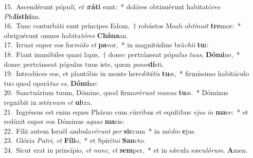 {15.~}Ascendérunt pópu\textit{li}, \textit{et} \textit{i}\textbf{rá}\textbf{ti} sunt:~* dolóres obtinuérunt habitató\textit{res} \textit{Phi}\textbf{lís}\textbf{thi}im.\\
{16.~}Tunc conturbáti sunt príncipes Edom,~† robústos Moab ob\textit{tí}\textit{nu}\textit{it} \textbf{tre}mor:~* obriguérunt omnes habita\textit{tó}\textit{res} \textbf{Chá}\textbf{na}an.\\
{17.~}Irruat super eos for\textit{mí}\textit{do} \textit{et} \textbf{pa}vor,~* in magnitúdine brá\textit{chi}\textit{i} \textbf{tu}i:\\
{18.~}Fiant immóbiles quasi lapis,~† donec pertránseat pópu\textit{lus} \textit{tu}\textit{us}, \textbf{Dó}\textbf{mi}ne,~* donec pertránseat pópulus tuus iste, quem \textit{pos}\textit{se}\textbf{dí}sti.\\
{19.~}Introdúces eos, et plantábis in monte here\textit{di}\textit{tá}\textit{tis} \textbf{tu}æ,~* firmíssimo habitáculo tuo quod operá\textit{tus} \textit{es}, \textbf{Dó}\textbf{mi}ne:\\
{20.~}Sanctuárium tuum, Dómine, quod firmavé\textit{runt} \textit{ma}\textit{nus} \textbf{tu}æ.~* Dóminus regnábit in ætér\textit{num} \textit{et} \textbf{ul}tra.\\
{21.~}Ingréssus est enim eques Phárao cum cúrribus et equítibus \textit{e}\textit{jus} \textit{in} \textbf{ma}re:~* et redúxit super eos Dóminus \textit{a}\textit{quas} \textbf{ma}ris:\\
{22.~}Fílii autem Israël ambula\textit{vé}\textit{runt} \textit{per} \textbf{sic}cum~* in mé\textit{di}\textit{o} \textbf{e}jus.\\
{23.~}Glória \textit{Pa}\textit{tri}, \textit{et} \textbf{Fí}\textbf{li}o,~* et Spirí\textit{tu}\textit{i} \textbf{San}cto.\\
{24.~}Sicut erat in princípio, \textit{et} \textit{nunc}, \textit{et} \textbf{sem}per,~* et in sǽcula sæcu\textit{ló}\textit{rum}. \textbf{A}men.\\
